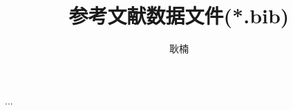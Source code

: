 \documentclass[fontset = none, t]{ctexbeamer}
\title[文献数据文件]{参考文献数据文件(*.bib)}
\author[N. Geng]{耿楠}
\institute[教发中心]{西北农林科技大学教学发展中心}
\date{\tosemester}
\begin{document}
\maketitle

\begin{frame}
  ...
\end{frame}
\end{document}
